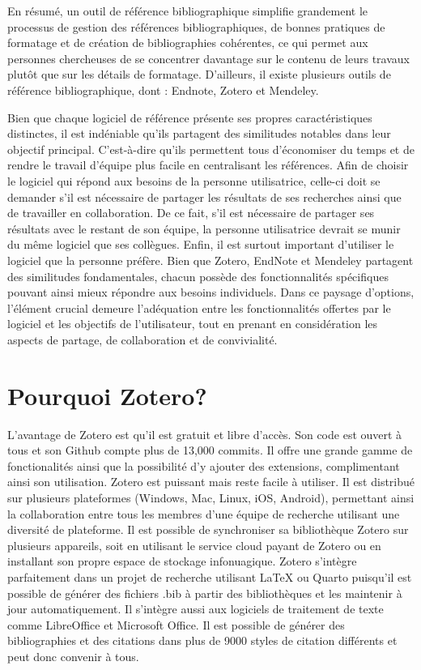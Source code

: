 \documentclass[
  letterpaper,
]{scrbook}
\begin{document}
En résumé, un outil de référence bibliographique simplifie grandement le
processus de gestion des références bibliographiques, de bonnes
pratiques de formatage et de création de bibliographies cohérentes, ce
qui permet aux personnes chercheuses de se concentrer davantage sur le
contenu de leurs travaux plutôt que sur les détails de formatage.
D'ailleurs, il existe plusieurs outils de référence bibliographique,
dont : Endnote, Zotero et Mendeley.

Bien que chaque logiciel de référence présente ses propres
caractéristiques distinctes, il est indéniable qu'ils partagent des
similitudes notables dans leur objectif principal. C'est-à-dire qu'ils
permettent tous d'économiser du temps et de rendre le travail d'équipe
plus facile en centralisant les références. Afin de choisir le logiciel
qui répond aux besoins de la personne utilisatrice, celle-ci doit se
demander s'il est nécessaire de partager les résultats de ses recherches
ainsi que de travailler en collaboration. De ce fait, s'il est
nécessaire de partager ses résultats avec le restant de son équipe, la
personne utilisatrice devrait se munir du même logiciel que ses
collègues. Enfin, il est surtout important d'utiliser le logiciel que la
personne préfère. Bien que Zotero, EndNote et Mendeley partagent des
similitudes fondamentales, chacun possède des fonctionnalités
spécifiques pouvant ainsi mieux répondre aux besoins individuels. Dans
ce paysage d'options, l'élément crucial demeure l'adéquation entre les
fonctionnalités offertes par le logiciel et les objectifs de
l'utilisateur, tout en prenant en considération les aspects de partage,
de collaboration et de convivialité.

\hypertarget{pourquoi-zotero}{%
\section{Pourquoi Zotero?}\label{pourquoi-zotero}}

L'avantage de Zotero est qu'il est gratuit et libre d'accès. Son code
est ouvert à tous et son Github compte plus de 13,000 commits. Il offre
une grande gamme de fonctionalités ainsi que la possibilité d'y ajouter
des extensions, complimentant ainsi son utilisation. Zotero est puissant
mais reste facile à utiliser. Il est distribué sur plusieurs plateformes
(Windows, Mac, Linux, iOS, Android), permettant ainsi la collaboration
entre tous les membres d'une équipe de recherche utilisant une diversité
de plateforme. Il est possible de synchroniser sa bibliothèque Zotero
sur plusieurs appareils, soit en utilisant le service cloud payant de
Zotero ou en installant son propre espace de stockage infonuagique.
Zotero s'intègre parfaitement dans un projet de recherche utilisant
LaTeX ou Quarto puisqu'il est possible de générer des fichiers .bib à
partir des bibliothèques et les maintenir à jour automatiquement. Il
s'intègre aussi aux logiciels de traitement de texte comme LibreOffice
et Microsoft Office. Il est possible de générer des bibliographies et
des citations dans plus de 9000 styles de citation différents et peut
donc convenir à tous.
\end{document}
